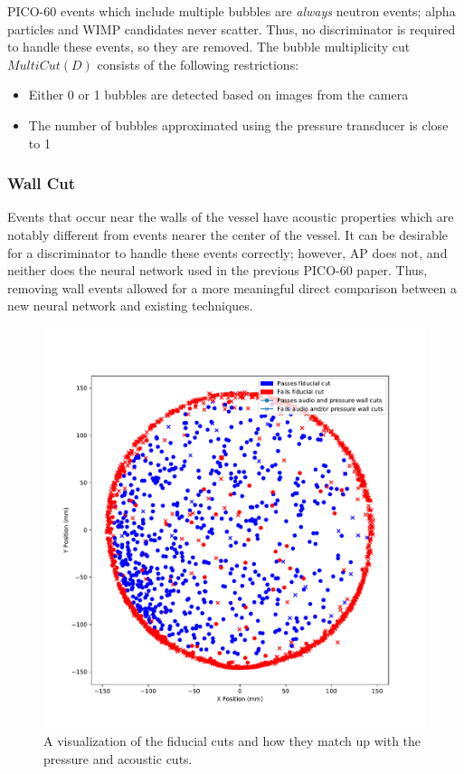 \documentclass[10pt]{article}
\begin{document}
PICO-60 events which include multiple bubbles are \textit{always} neutron events; alpha particles and WIMP candidates never scatter. Thus, no discriminator is required to handle these events, so they are removed. The bubble multiplicity cut $MultiCut(D)$ consists of the following restrictions:

\begin{itemize}
    \item Either 0 or 1 bubbles are detected based on images from the camera
    \item The number of bubbles approximated using the pressure transducer is close to 1
\end{itemize}

\subsubsection{Wall Cut}

Events that occur near the walls of the vessel have acoustic properties which are notably different from events nearer the center of the vessel. It can be desirable for a discriminator to handle these events correctly; however, AP does not, and neither does the neural network used in the previous PICO-60 paper. Thus, removing wall events allowed for a more meaningful direct comparison between a new neural network and existing techniques.

\begin{figure}[h!]
    \centering
    \includegraphics[width=\textwidth]{wall_event_positions}
    \caption{\label{} A visualization of the fiducial cuts and how they match up with the pressure and acoustic cuts.}
\end{figure}
\end{document}
